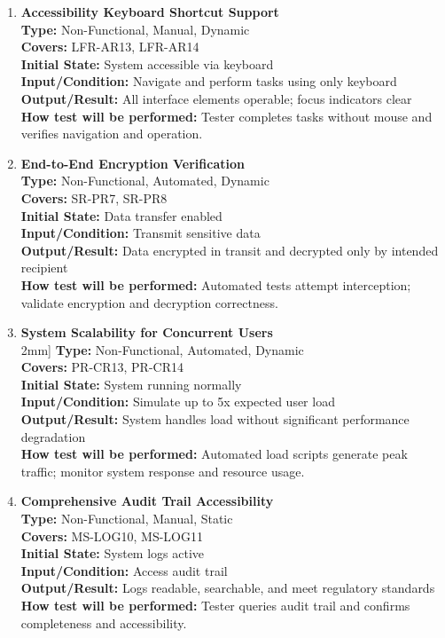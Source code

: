 \documentclass[12pt, titlepage]{article}
\begin{document}
\begin{enumerate}[label=NFR-ST \arabic*., wide=0pt, leftmargin=*]
  \item \textbf{Accessibility Keyboard Shortcut Support} \\[2mm]
    \textbf{Type:} Non-Functional, Manual, Dynamic \\
    \textbf{Covers:} LFR-AR13, LFR-AR14 \\
    \textbf{Initial State:} System accessible via keyboard \\
    \textbf{Input/Condition:} Navigate and perform tasks using only keyboard \\
    \textbf{Output/Result:} All interface elements operable; focus
    indicators clear \\[2mm]
    \textbf{How test will be performed:} Tester completes tasks
    without mouse and verifies navigation and operation.

  \item \textbf{End-to-End Encryption Verification} \\[2mm]
    \textbf{Type:} Non-Functional, Automated, Dynamic \\
    \textbf{Covers:} SR-PR7, SR-PR8 \\
    \textbf{Initial State:} Data transfer enabled \\
    \textbf{Input/Condition:} Transmit sensitive data \\
    \textbf{Output/Result:} Data encrypted in transit and decrypted
    only by intended recipient \\[2mm]
    \textbf{How test will be performed:} Automated tests attempt
    interception; validate encryption and decryption correctness.

  \item \textbf{System Scalability for Concurrent Users} \\2mm]
    \textbf{Type:} Non-Functional, Automated, Dynamic \\
    \textbf{Covers:} PR-CR13, PR-CR14 \\
    \textbf{Initial State:} System running normally \\
    \textbf{Input/Condition:} Simulate up to 5x expected user load \\
    \textbf{Output/Result:} System handles load without significant
    performance degradation \\[2mm]
    \textbf{How test will be performed:} Automated load scripts
    generate peak traffic; monitor system response and resource usage.

  \item \textbf{Comprehensive Audit Trail Accessibility} \\[2mm]
    \textbf{Type:} Non-Functional, Manual, Static \\
    \textbf{Covers:} MS-LOG10, MS-LOG11 \\
    \textbf{Initial State:} System logs active \\
    \textbf{Input/Condition:} Access audit trail \\
    \textbf{Output/Result:} Logs readable, searchable, and meet
    regulatory standards \\[2mm]
    \textbf{How test will be performed:} Tester queries audit trail
    and confirms completeness and accessibility.


\end{enumerate}
\end{document}
